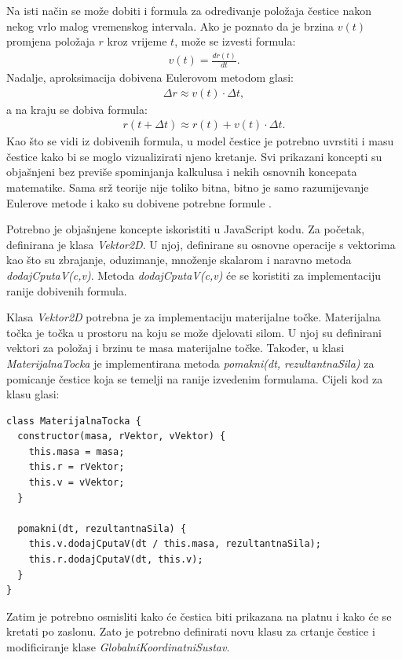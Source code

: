 \documentclass{foi}
\begin{document}
Na isti način se može dobiti i formula za određivanje položaja čestice nakon nekog vrlo malog vremenskog intervala. Ako je poznato da je brzina $v(t)$ promjena položaja $r$ kroz vrijeme $t$, može se izvesti formula:
 \begin{align*}
v(t) = \frac{dr(t)}{dt}.
\end{align*}
Nadalje, aproksimacija dobivena Eulerovom metodom glasi:
 \begin{align*}
\Delta r \approx v(t) \cdot \Delta t,
\end{align*}
a na kraju se dobiva formula:
 \begin{align*}
r(t + \Delta t) \approx r(t) + v(t) \cdot \Delta t.
\end{align*}
Kao što se vidi iz dobivenih formula, u model čestice je potrebno uvrstiti i masu čestice kako bi se moglo vizualizirati njeno kretanje. Svi prikazani koncepti su objašnjeni bez previše spominjanja kalkulusa i nekih osnovnih koncepata matematike. Sama srž teorije nije toliko bitna, bitno je samo razumijevanje Eulerove metode i kako su dobivene potrebne formule \parencite{HipHorvatFizika}.

Potrebno je objašnjene koncepte iskoristiti u JavaScript kodu. Za početak, definirana je klasa \textit{Vektor2D}. U njoj, definirane su osnovne operacije s vektorima kao što su zbrajanje, oduzimanje, množenje skalarom i naravno metoda \textit{dodajCputaV(c,v)}. Metoda \textit{dodajCputaV(c,v)} će se koristiti za implementaciju ranije dobivenih formula.

Klasa \textit{Vektor2D} potrebna je za implementaciju materijalne točke. Materijalna točka je točka u prostoru na koju se može djelovati silom. U njoj su definirani vektori za položaj i brzinu te masa materijalne točke. Također, u klasi \textit{MaterijalnaTocka} je implementirana metoda \textit{pomakni(dt, rezultantnaSila)} za pomicanje čestice koja se temelji na ranije izvedenim formulama. Cijeli kod za klasu glasi:

\begin{verbatim}
class MaterijalnaTocka {
  constructor(masa, rVektor, vVektor) {
    this.masa = masa;
    this.r = rVektor;
    this.v = vVektor;
  }

  pomakni(dt, rezultantnaSila) {
    this.v.dodajCputaV(dt / this.masa, rezultantnaSila);
    this.r.dodajCputaV(dt, this.v);
  }
}
\end{verbatim}

Zatim je potrebno osmisliti kako će čestica biti prikazana na platnu i kako će se kretati po zaslonu. Zato je potrebno definirati novu klasu za crtanje čestice i modificiranje klase \textit{GlobalniKoordinatniSustav}. 
\end{document}
